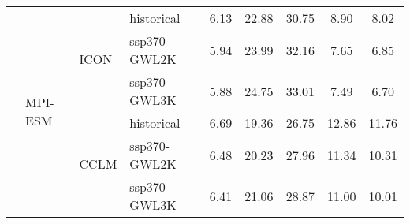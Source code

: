 \begin{table}[!htbp]
{\begin{tabular}{lll|l|c|c|c|c|c}
\cmidrule(lr){3-9}
\cmidrule(lr){2-9}
 & \multirow{6}{*}{MPI-ESM} & \multirow{3}{*}{ICON} & historical & 6.13 & 22.88 & 30.75 & 8.90 & 8.02 \\
 &  &  & ssp370-GWL2K & 5.94 & 23.99 & 32.16 & 7.65 & 6.85 \\
 &  &  & ssp370-GWL3K & 5.88 & 24.75 & 33.01 & 7.49 & 6.70 \\
\cmidrule(lr){3-9}
 &  & \multirow{3}{*}{CCLM} & historical & 6.69 & 19.36 & 26.75 & 12.86 & 11.76 \\
 &  &  & ssp370-GWL2K & 6.48 & 20.23 & 27.96 & 11.34 & 10.31 \\
 &  &  & ssp370-GWL3K & 6.41 & 21.06 & 28.87 & 11.00 & 10.01 \\
\bottomrule
\end{tabular}
}
\end{table}

